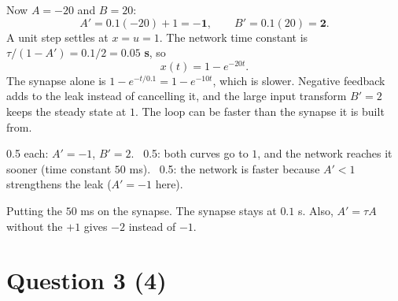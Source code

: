\documentclass[11pt,letterpaper]{article}
\newcommand{\ans}[1]{\par\vspace{4pt}{\bfseries #1}\quad}
\begin{document}
\ans{(b) [2]}
Now $A = -20$ and $B = 20$:
\[
A' = 0.1(-20) + 1 = \mathbf{-1}, \qquad B' = 0.1(20) = \mathbf{2}.
\]
A unit step settles at $x = u = 1$. The network time constant is $\tau/(1 - A') = 0.1/2 = \mathbf{0.05}$ \textbf{s}, so
\[
x(t) = 1 - e^{-20t}.
\]
The synapse alone is $1 - e^{-t/0.1} = 1 - e^{-10t}$, which is slower. Negative feedback adds to the leak instead of cancelling it, and the large input transform $B' = 2$ keeps the steady state at $1$. The loop can be faster than the synapse it is built from.
\begin{center}
\end{center}
\begin{marking}
0.5 each: $A' = -1$, $B' = 2$. \ 0.5: both curves go to $1$, and the network reaches it sooner (time constant $50$ ms). \ 0.5: the network is faster because $A' < 1$ strengthens the leak ($A' = -1$ here).
\end{marking}
\begin{trap}
Putting the $50$ ms on the synapse. The synapse stays at $0.1$ s. Also, $A' = \tau A$ without the $+1$ gives $-2$ instead of $-1$.
\end{trap}

\section*{Question 3 \hfill (4)}
\end{document}
